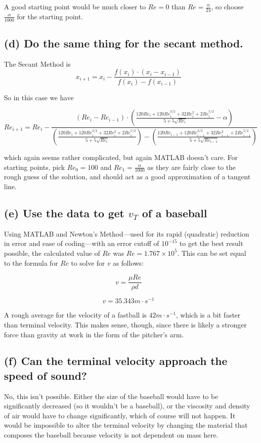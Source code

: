 \documentclass{article}[12pt]
\begin{document}
A good starting point would be much closer to $Re = 0$ than $Re = \frac{\alpha}{24}$, so choose $\frac{\alpha}{1000}$ for the starting point.

\subsection*{(d) \normalsize Do the same thing for the secant method.}

The Secant Method is $$x_{i+1} = x_i - \frac{f(x_i)\cdot (x_i - x_{i-1})}{f(x_i) - f(x_{i-1})}$$

So in this case we have

$$Re_{i+1} = Re_i - \frac{(Re_i - Re_{i-1})\cdot (\frac{120Re_i + 120Re_i^{3/2} + 32Re_i^2 + 2Re_i^{5/2}}{5 + 5\sqrt{Re_i}} - \alpha)}{(\frac{120Re_i + 120Re_i^{3/2} + 32Re_i^2 + 2Re_i^{5/2}}{5 + 5\sqrt{Re_i}}) - (\frac{120Re_{i-1} + 120Re_{i-1}^{3/2} + 32Re_{i-1}^2 + 2Re_{i-1}^{5/2}}{5 + 5\sqrt{Re_{i-1}}})}$$

which again seems rather complicated, but again MATLAB doesn't care. For starting points, pick $Re_0 = 100$ and $Re_1 = \frac{\alpha}{1000}$ as they are fairly close to the rough guess of the solution, and should act as a good approximation of a tangent line.

\subsection*{(e) \normalsize Use the data to get $v_T$ of a baseball}

Using MATLAB and Newton's Method---used for its rapid (quadratic) reduction in error and ease of coding---with an error cutoff of $10^{-15}$ to get the best result possible, the calculated value of $Re$ was $Re = 1.767\times 10^{5}$. This can be set equal to the formula for $Re$ to solve for $v$ as follows:

$$v = \frac{\mu Re}{\rho d}$$

$$v = 35.343 m\cdot s^{-1}$$

A rough average for the velocity of a fastball is $42 m \cdot s^{-1}$, which is a bit faster than terminal velocity. This makes sense, though, since there is likely a stronger force than gravity at work in the form of the pitcher's arm.

\subsection*{(f) \normalsize Can the terminal velocity approach the speed of sound?}

No, this isn't possible. Either the size of the baseball would have to be significantly decreased (so it wouldn't be a baseball), or the viscosity and density of air would have to change significantly, which of course will not happen. It would be impossible to alter the terminal velocity by changing the material that composes the baseball because velocity is not dependent on mass here.
\end{document}
